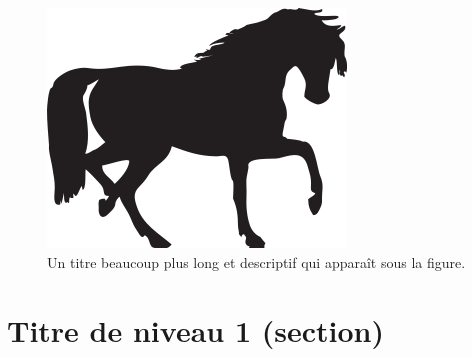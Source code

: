\begin{figure}
\begin{center}
	\includegraphics[scale=.5]{figures/part1/figure_33.png}
	\caption[Titre court table des matières]{Un titre beaucoup plus long et descriptif qui apparaît sous la figure.}
	\label{fig33}
\end{center}
\end{figure}


\section{Titre de niveau 1 (section)}
\blindtext


\clearpage
\thispagestyle{empty}